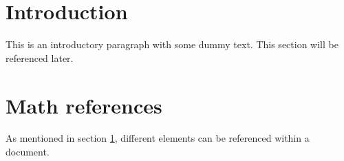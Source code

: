 \documentclass{article}
\begin{document}
    \section{Introduction} \label{introduction}
This is an introductory paragraph with some dummy text. This section will be referenced later.
    \section{Math references} \label{mathrefs}
As mentioned in section \ref{introduction}, different elements can be referenced within a document.
\end{document}
